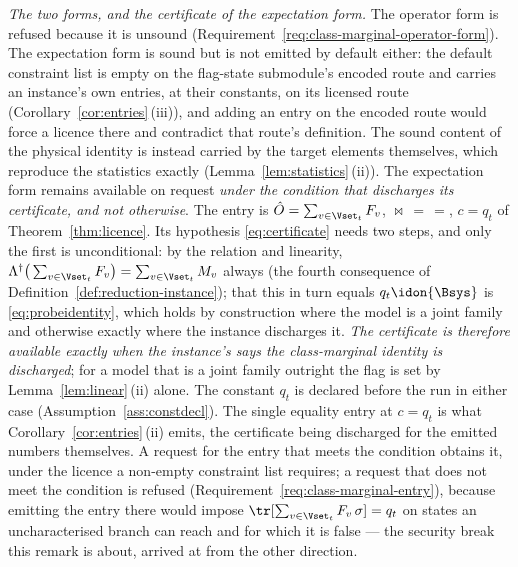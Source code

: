 \begin{remark}
\emph{The two forms, and the certificate of the expectation form.} The
operator form is refused because it is unsound
(Requirement~\ref{req:class-marginal-operator-form}). The expectation form is
sound but is not emitted by default either: the default constraint list is
empty on the flag-state submodule's encoded route and carries an instance's
own entries, at their constants, on its licensed route
(Corollary~\ref{cor:entries}\,(iii)), and adding an entry on the encoded route
would force a licence there and contradict that route's definition. The sound
content of the physical identity is instead carried by the target elements
themselves, which reproduce the statistics exactly
(Lemma~\ref{lem:statistics}\,(ii)). The expectation form remains available on
request \emph{under the condition that discharges its certificate, and not
otherwise}. The entry is $\hat O=\sum_{v\in\Vset_t}F_v$, $\bowtie\,=\,=$,
$c=q_t$ of Theorem~\ref{thm:licence}. Its hypothesis \eqref{eq:certificate}
needs two steps, and only the first is unconditional: by the relation and
linearity, $\Lambda^{\dagger}\big(\sum_{v\in\Vset_t}F_v\big)=\sum_{v\in\Vset_t}M_v$
always (the fourth consequence of Definition~\ref{def:reduction-instance});
that this in turn equals $q_t\idon{\Bsys}$ is \eqref{eq:probeidentity}, which
holds by construction where the model is a joint family and otherwise exactly
where the instance discharges it. \emph{The certificate is therefore
available exactly when the instance's  says the
class-marginal identity is discharged}; for a model that is a joint family outright the flag is set
by Lemma~\ref{lem:linear}\,(ii) alone. The constant $q_t$ is declared before
the run in either case (Assumption~\ref{ass:constdecl}). The single equality
entry at $c=q_t$ is what Corollary~\ref{cor:entries}\,(ii) emits, the
certificate being discharged for the emitted numbers themselves. A request
for the entry that meets the condition obtains it, under the licence a
non-empty constraint list requires; a request that does not meet the
condition is refused (Requirement~\ref{req:class-marginal-entry}), because
emitting the entry there would impose $\tr[\sum_{v\in\Vset_t}F_v\,\sigma]=q_t$
on states an uncharacterised branch can reach and for which it is false ---
the security break this remark is about, arrived at from the other direction.
\end{remark}
